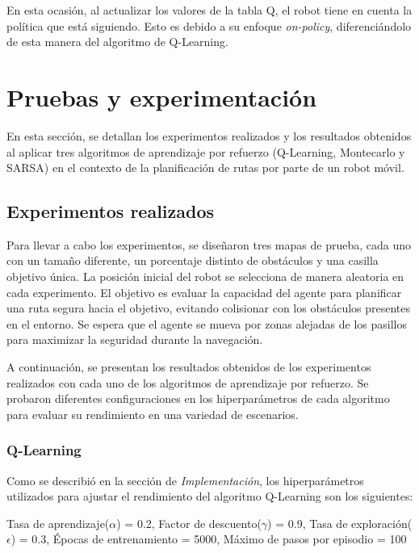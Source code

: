 \documentclass[conference,a4paper]{IEEEtran}
\begin{document}
  En esta ocasión, al actualizar los valores de la tabla Q, el robot tiene en cuenta la política que está siguiendo. Esto es debido a su enfoque \textit{on-policy}, diferenciándolo de esta manera del algoritmo de Q-Learning.\newline



\section{Pruebas y experimentación}
En esta sección, se detallan los experimentos realizados y los resultados obtenidos al aplicar tres algoritmos de aprendizaje por refuerzo (Q-Learning, Montecarlo y SARSA) 
en el contexto de la planificación de rutas por parte de un robot móvil.

\subsection{Experimentos realizados}

Para llevar a cabo los experimentos, se diseñaron tres mapas de prueba, cada uno con un tamaño diferente, un porcentaje distinto de obstáculos y 
una casilla objetivo única. La posición inicial del robot se selecciona de manera aleatoria en cada experimento. 
El objetivo es evaluar la capacidad del agente para planificar una ruta segura hacia el objetivo, evitando colisionar con los obstáculos presentes en el entorno. 
Se espera que el agente se mueva por zonas alejadas de los pasillos para maximizar la seguridad durante la navegación.\newline

A continuación, se presentan los resultados obtenidos de los experimentos realizados con cada uno de los algoritmos de aprendizaje por refuerzo. Se probaron diferentes configuraciones en los hiperparámetros de cada algoritmo para evaluar su rendimiento en una variedad de escenarios.

\subsubsection{\textbf{Q-Learning}}

Como se describió en la sección de \textit{Implementación}, los hiperparámetros utilizados para ajustar el rendimiento del algoritmo Q-Learning son los siguientes:\newline

Tasa de aprendizaje($\alpha$) = 0.2, Factor de descuento($\gamma$) = 0.9, Tasa de exploración($\epsilon$) = 0.3,  Épocas de entrenamiento = 5000, Máximo de pasos por episodio = 100\newline
\end{document}
